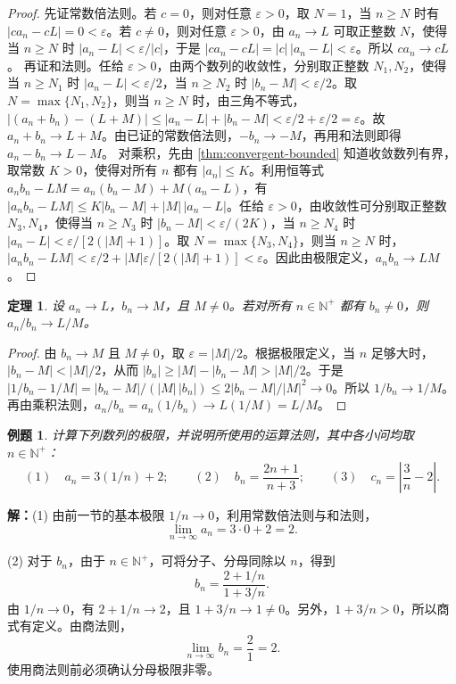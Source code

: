 \documentclass[UTF8,fontset=fandol,11pt]{ctexart}
\newtheorem{theorem}[definition]{定理}
\newtheorem{example}[definition]{例题}
\begin{document}
\begin{proof}
先证常数倍法则。若 $c=0$，则对任意 $\varepsilon>0$，取 $N=1$，当 $n\geq N$ 时有 $|ca_n-cL|=0<\varepsilon$。若 $c\neq0$，则对任意 $\varepsilon>0$，由 $a_n\to L$ 可取正整数 $N$，使得当 $n\geq N$ 时 $|a_n-L|<\varepsilon/|c|$，于是 $|ca_n-cL|=|c|\,|a_n-L|<\varepsilon$。所以 $ca_n\to cL$。
再证和法则。任给 $\varepsilon>0$，由两个数列的收敛性，分别取正整数 $N_1,N_2$，使得当 $n\geq N_1$ 时 $|a_n-L|<\varepsilon/2$，当 $n\geq N_2$ 时 $|b_n-M|<\varepsilon/2$。取 $N=\max\{N_1,N_2\}$，则当 $n\geq N$ 时，由三角不等式，$|(a_n+b_n)-(L+M)|\leq|a_n-L|+|b_n-M|<\varepsilon/2+\varepsilon/2=\varepsilon$。故 $a_n+b_n\to L+M$。由已证的常数倍法则，$-b_n\to-M$，再用和法则即得 $a_n-b_n\to L-M$。
对乘积，先由 \ref{thm:convergent-bounded} 知道收敛数列有界，取常数 $K>0$，使得对所有 $n$ 都有 $|a_n|\leq K$。利用恒等式 $a_nb_n-LM=a_n(b_n-M)+M(a_n-L)$，有 $|a_nb_n-LM|\leq K|b_n-M|+|M|\,|a_n-L|$。任给 $\varepsilon>0$，由收敛性可分别取正整数 $N_3,N_4$，使得当 $n\geq N_3$ 时 $|b_n-M|<\varepsilon/(2K)$，当 $n\geq N_4$ 时 $|a_n-L|<\varepsilon/[2(|M|+1)]$。取 $N=\max\{N_3,N_4\}$，则当 $n\geq N$ 时，$|a_nb_n-LM|<\varepsilon/2+|M|\varepsilon/[2(|M|+1)]<\varepsilon$。因此由极限定义，$a_nb_n\to LM$。
\end{proof}
\begin{theorem}
\label{thm:limit-quotient}设 $a_n\to L$，$b_n\to M$，且 $M\neq0$。若对所有 $n\in\mathbb{N}^{+}$ 都有 $b_n\neq0$，则 $a_n/b_n\to L/M$。
\end{theorem}
\begin{proof}
由 $b_n\to M$ 且 $M\neq0$，取 $\varepsilon=|M|/2$。根据极限定义，当 $n$ 足够大时，$|b_n-M|<|M|/2$，从而 $|b_n|\geq|M|-|b_n-M|>|M|/2$。于是 $|1/b_n-1/M|=|b_n-M|/(|M|\,|b_n|)\leq2|b_n-M|/|M|^2\to0$。所以 $1/b_n\to1/M$。再由乘积法则，$a_n/b_n=a_n(1/b_n)\to L(1/M)=L/M$。
\end{proof}
\begin{example}
计算下列数列的极限，并说明所使用的运算法则，其中各小问均取 $n\in\mathbb{N}^{+}$：
\[
(1)\quad a_n=3(1/n)+2;\qquad
(2)\quad b_n=\frac{2n+1}{n+3};\qquad
(3)\quad c_n=\left|\frac3n-2\right|.
\]
\end{example}
\par\noindent\textbf{解：}(1) 由前一节的基本极限 $1/n\to0$，利用常数倍法则与和法则，
\[
\lim_{n\to\infty}a_n=3\cdot0+2=2.
\]

(2) 对于 $b_n$，由于 $n\in\mathbb{N}^{+}$，可将分子、分母同除以 $n$，得到
\[
b_n=\frac{2+1/n}{1+3/n}.
\]
由 $1/n\to0$，有 $2+1/n\to2$，且 $1+3/n\to1\neq0$。另外，$1+3/n>0$，所以商式有定义。由商法则，
\[
\lim_{n\to\infty}b_n=\frac21=2.
\]
使用商法则前必须确认分母极限非零。
\end{document}
